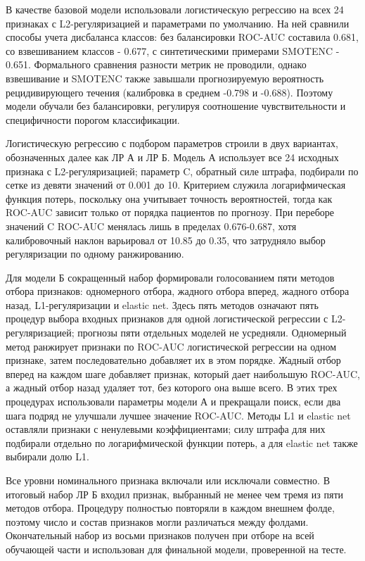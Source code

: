 \documentclass{crm-article}
\begin{document}
В качестве базовой модели использовали логистическую регрессию на всех 24 признаках с L2-регуляризацией и параметрами по умолчанию. На ней сравнили способы учета дисбаланса классов: без балансировки ROC-AUC составила 0.681, со взвешиванием классов - 0.677, с синтетическими примерами SMOTENC - 0.651. Формального сравнения разности метрик не проводили, однако взвешивание и SMOTENC также завышали прогнозируемую вероятность рецидивирующего течения (калибровка в среднем -0.798 и -0.688). Поэтому модели обучали без балансировки, регулируя соотношение чувствительности и специфичности порогом классификации.

Логистическую регрессию с подбором параметров строили в двух вариантах, обозначенных далее как ЛР А и ЛР Б. Модель А использует все 24 исходных признака с L2-регуляризацией; параметр C, обратный силе штрафа, подбирали по сетке из девяти значений от 0.001 до 10. Критерием служила логарифмическая функция потерь, поскольку она учитывает точность вероятностей, тогда как ROC-AUC зависит только от порядка пациентов по прогнозу. При переборе значений C ROC-AUC менялась лишь в пределах 0.676-0.687, хотя калибровочный наклон варьировал от 10.85 до 0.35, что затрудняло выбор регуляризации по одному ранжированию.

Для модели Б сокращенный набор формировали голосованием пяти методов отбора признаков: одномерного отбора, жадного отбора вперед, жадного отбора назад, L1-регуляризации и elastic net. Здесь пять методов означают пять процедур выбора входных признаков для одной логистической регрессии с L2-регуляризацией; прогнозы пяти отдельных моделей не усредняли. Одномерный метод ранжирует признаки по ROC-AUC логистической регрессии на одном признаке, затем последовательно добавляет их в этом порядке. Жадный отбор вперед на каждом шаге добавляет признак, который дает наибольшую ROC-AUC, а жадный отбор назад удаляет тот, без которого она выше всего. В этих трех процедурах использовали параметры модели А и прекращали поиск, если два шага подряд не улучшали лучшее значение ROC-AUC. Методы L1 и elastic net оставляли признаки с ненулевыми коэффициентами; силу штрафа для них подбирали отдельно по логарифмической функции потерь, а для elastic net также выбирали долю L1.

Все уровни номинального признака включали или исключали совместно. В итоговый набор ЛР Б входил признак, выбранный не менее чем тремя из пяти методов отбора. Процедуру полностью повторяли в каждом внешнем фолде, поэтому число и состав признаков могли различаться между фолдами. Окончательный набор из восьми признаков получен при отборе на всей обучающей части и использован для финальной модели, проверенной на тесте.
\end{document}
